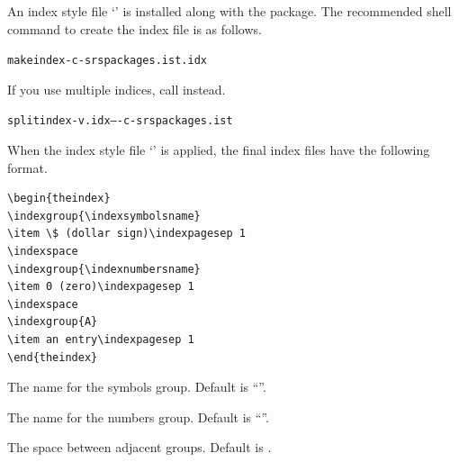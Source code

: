 \documentclass{scrartcl}
\begin{document}
An index style file ‘’ is installed along with
the  package.  The recommended shell command to
create the index file  is as follows.
\begin{display}
\begin{alltt}
makeindex -c -s rspackages.ist .idx
\end{alltt}
\end{display}
If you use multiple indices, call  instead.
\begin{display}
\begin{alltt}
splitindex -v .idx -- -c -s rspackages.ist
\end{alltt}
\end{display}
When the index style file ‘’ is applied, the
final index files have the following format.
\begin{display}
\begin{verbatim}
\begin{theindex}
\indexgroup{\indexsymbolsname}
\item \$ (dollar sign)\indexpagesep 1
\indexspace
\indexgroup{\indexnumbersname}
\item 0 (zero)\indexpagesep 1
\indexspace
\indexgroup{A}
\item an entry\indexpagesep 1
\end{theindex}
\end{verbatim}
\end{display}

\begin{definition}
The name for the symbols group.
Default is “\indexsymbolsname”.
\end{definition}

\begin{definition}
The name for the numbers group.
Default is “\indexnumbersname”.
\end{definition}

\begin{definition}
The space between adjacent groups.
Default is \symb{\medskip}.
\end{definition}
\end{document}
